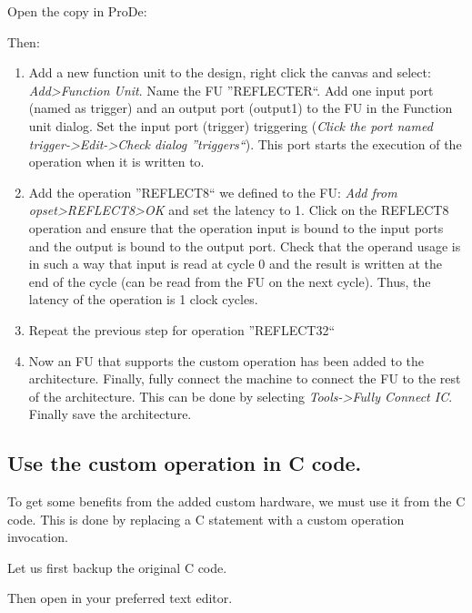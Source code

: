 \documentclass[twoside]{tceusermanual}
\begin{document}

Open the copy in ProDe:


Then:
\begin{enumerate}
\item%
Add a new function unit to the design, right click the canvas and select:
\textit{Add>Function Unit}. Name the FU ''REFLECTER``. Add one input
port (named as trigger) and an output port (output1) to the FU in
the Function unit dialog. Set the input port (trigger)
triggering (\textit{Click the port named trigger->Edit->Check dialog 
''triggers``}). This port starts the execution of the operation when
it is written to.
\item%
Add the operation ''REFLECT8`` we defined to the FU: \textit{Add from
opset>REFLECT8>OK} and set the latency to 1. Click on the REFLECT8 operation and
ensure that the operation input is bound to the input ports and the output
is bound to the output port. Check that the operand usage is in such a way that
input is read at cycle 0 and the result is written at the end of the 
cycle (can be read from the FU on the next cycle). Thus, the latency of
the operation is 1 clock cycles.
\item%
Repeat the previous step for operation ''REFLECT32``
\item%
Now an FU that supports the custom operation has been added to the architecture. 
Finally, fully connect the machine to connect the
FU to the rest of the architecture. This can be done by selecting
\textit{Tools->Fully Connect IC}. Finally save the architecture.
\end{enumerate}


\subsection{Use the custom operation in C code.}

To get some benefits from the added custom hardware,
we must use it from the C code. This is done by replacing
a C statement with a custom operation invocation. 

Let us first backup the original C code.


Then open  in your preferred text editor.
\end{document}
